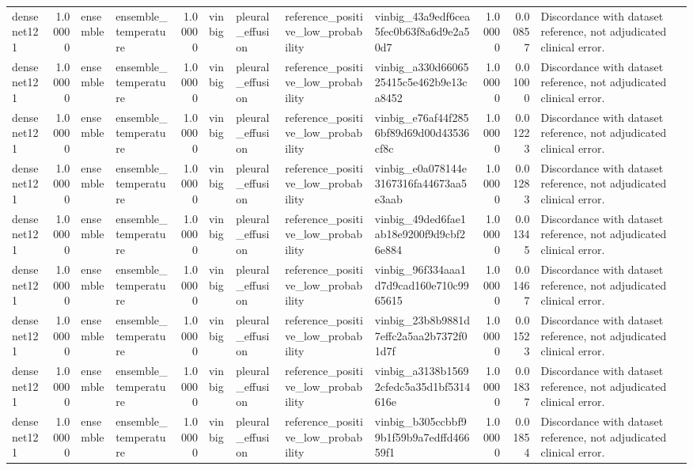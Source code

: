 \begin{tabular}{lrllrllllrrl}
densenet121 & 1.00000 & ensemble & ensemble\_temperature & 1.00000 & vinbig & pleural\_effusion & reference\_positive\_low\_probability & vinbig\_43a9edf6cea5fec0b63f8a6d9e2a50d7 & 1.00000 & 0.00857 & Discordance with dataset reference, not adjudicated clinical error. \\
densenet121 & 1.00000 & ensemble & ensemble\_temperature & 1.00000 & vinbig & pleural\_effusion & reference\_positive\_low\_probability & vinbig\_a330d6606525415c5e462b9e13ca8452 & 1.00000 & 0.01000 & Discordance with dataset reference, not adjudicated clinical error. \\
densenet121 & 1.00000 & ensemble & ensemble\_temperature & 1.00000 & vinbig & pleural\_effusion & reference\_positive\_low\_probability & vinbig\_e76af44f2856bf89d69d00d43536cf8c & 1.00000 & 0.01223 & Discordance with dataset reference, not adjudicated clinical error. \\
densenet121 & 1.00000 & ensemble & ensemble\_temperature & 1.00000 & vinbig & pleural\_effusion & reference\_positive\_low\_probability & vinbig\_e0a078144e3167316fa44673aa5e3aab & 1.00000 & 0.01283 & Discordance with dataset reference, not adjudicated clinical error. \\
densenet121 & 1.00000 & ensemble & ensemble\_temperature & 1.00000 & vinbig & pleural\_effusion & reference\_positive\_low\_probability & vinbig\_49ded6fae1ab18e9200f9d9cbf26e884 & 1.00000 & 0.01345 & Discordance with dataset reference, not adjudicated clinical error. \\
densenet121 & 1.00000 & ensemble & ensemble\_temperature & 1.00000 & vinbig & pleural\_effusion & reference\_positive\_low\_probability & vinbig\_96f334aaa1d7d9cad160e710c9965615 & 1.00000 & 0.01467 & Discordance with dataset reference, not adjudicated clinical error. \\
densenet121 & 1.00000 & ensemble & ensemble\_temperature & 1.00000 & vinbig & pleural\_effusion & reference\_positive\_low\_probability & vinbig\_23b8b9881d7effc2a5aa2b7372f01d7f & 1.00000 & 0.01523 & Discordance with dataset reference, not adjudicated clinical error. \\
densenet121 & 1.00000 & ensemble & ensemble\_temperature & 1.00000 & vinbig & pleural\_effusion & reference\_positive\_low\_probability & vinbig\_a3138b15692cfedc5a35d1bf5314616e & 1.00000 & 0.01837 & Discordance with dataset reference, not adjudicated clinical error. \\
densenet121 & 1.00000 & ensemble & ensemble\_temperature & 1.00000 & vinbig & pleural\_effusion & reference\_positive\_low\_probability & vinbig\_b305ccbbf99b1f59b9a7edffd46659f1 & 1.00000 & 0.01854 & Discordance with dataset reference, not adjudicated clinical error. \\

\end{tabular}
